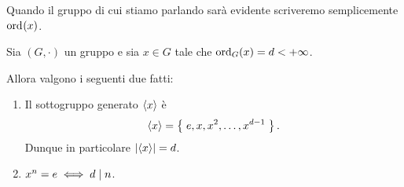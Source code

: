 Quando il gruppo di cui stiamo parlando sarà evidente scriveremo semplicemente $\ord{x}$.

\begin{proposition}
     \label{prop:sgr_generato}
    Sia $(G, \cdot)$ un gruppo e sia $x \in G$ tale che $\ord[G]{x} = d < +\infty$. 

    Allora valgono i seguenti due fatti:
    \begin{enumerate}[label={(\roman*)}, ref={\theproposition: (\roman*)}]
        \item \label{prop:sgr_generato:expr} Il sottogruppo generato $\gen{x}$ è \[
            \gen{x} = \set{e, x, x^2, \dots, x^{d-1}}.    
        \] Dunque in particolare $\abs*{\gen* x} = d$.
        \item \label{prop:sgr_generato:ord_div_n} $x^n = e \iff d \divides n$.
    \end{enumerate}
\end{proposition}
